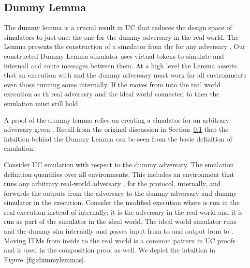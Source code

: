 \subsection{Dummy Lemma} \label{sec:dummy}
The dummy lemma is a crucial result in UC that reduces the design space of simulators to just one: the one for the dummy adversary in the real world.
The Lemma presents the construction of a simulator from the \DS for any adversary \A. Our constructed Dummy Lemma simulator uses virtual tokens to simulate \DS and \A internall and route messages between them.
At a high level the Lemma asserts that an execution with \DS and the dummy adversary must work for all environments even those running some \A internally.
If the \A moves from \Z into the real world execution as th real adverasry and the ideal world connected to \DS then the emulation must still hold.

A proof of the dummy lemma relies on creating a simulator \Sim for an arbitrary adversary given \DS.
Recall from the original discussion in Section~\ref{sec:dummy} that the intuition behind the Dummy Lemma can be seen from the basic definition of emulation.

Consider UC emulation with respect to the dummy adversary. The emulation definition quantifies over all environments. 
This includes an environment that runs any arbitrary real-world adversary \A, for the protocol, internally, and \Z forwards the outputs from the adversary to the dummy adversary and dummy simulator in the execution.
Consider the modified execution where \A is run in the real execution instead of internally: it is the adversary in the real world and it is run as part of the simulator in the ideal world.
The ideal world simulator runs \A and the dummy sim internally and passes input from \Z to \A and output from \A to \DS.
Moving ITMs from inside \Z to the real world is a common pattern in UC proofs and is used in the composition proof as well.
We depict the intuition in Figure~\ref{fig:dummylemmas}.

